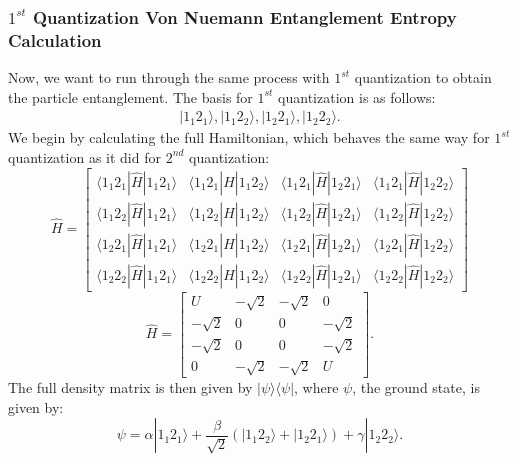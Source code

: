 \subsubsection{$1^{st}$ Quantization Von Nuemann Entanglement Entropy Calculation}
Now, we want to run through the same process with $1^{st}$ quantization to obtain the particle entanglement. The basis for $1^{st}$ quantization is as follows:
\begin{align}
|1_1 2_1 \rangle, |1_1 2_2 \rangle, |1_2 2_1 \rangle, |1_2 2_2 \rangle.
\end{align}
\noindent We begin by calculating the full Hamiltonian, which behaves the same way for $1^{st}$ quantization as it did for $2^{nd}$ quantization:
\begin{equation}
\hat{H} = \begin{bmatrix} \langle 1_1 2_1 | \hat{H} | 1_1 2_1 \rangle & \langle 1_1 2_1 | \hat{H} | 1_1 2_2 \rangle & \langle 1_1 2_1 | \hat{H} | 1_2 2_1 \rangle & \langle 1_1 2_1 | \hat{H} | 1_2 2_2 \rangle \\ \langle 1_1 2_2 | \hat{H} | 1_1 2_1 \rangle & \langle 1_1 2_2 | \hat{H} | 1_1 2_2 \rangle & \langle 1_1 2_2 | \hat{H} | 1_2 2_1 \rangle & \langle 1_1 2_2 | \hat{H} | 1_2 2_2 \rangle \\ \langle 1_2 2_1 | \hat{H} | 1_1 2_1 \rangle & \langle 1_2 2_1 | \hat{H} | 1_1 2_2 \rangle & \langle 1_2 2_1 | \hat{H} | 1_2 2_1 \rangle & \langle 1_2 2_1 | \hat{H} | 1_2 2_2 \rangle \\ \langle 1_2 2_2 | \hat{H} | 1_1 2_1 \rangle & \langle 1_2 2_2 | \hat{H} | 1_1 2_2 \rangle & \langle 1_2 2_2 | \hat{H} | 1_2 2_1 \rangle & \langle 1_2 2_2 | \hat{H} | 1_2 2_2 \rangle \end{bmatrix} 
\end{equation}
\begin{equation}
\hat{H} = \begin{bmatrix} U & -\sqrt{2} & -\sqrt{2} & 0 \\ -\sqrt{2} & 0 & 0 & -\sqrt{2} \\ -\sqrt{2} & 0 & 0 & -\sqrt{2} \\ 0 & -\sqrt{2} & -\sqrt{2} & U \end{bmatrix}.
\end{equation}
\noindent The full density matrix is then given by $|\psi \rangle \langle \psi|$, where $\psi$, the ground state, is given by:
\begin{equation*}
\psi = \alpha |1_1 2_1 \rangle + \frac{\beta}{\sqrt{2}} \left( |1_1 2_2 \rangle + |1_2 2_1 \rangle \right) + \gamma |1_2 2_2 \rangle.
\end{equation*}
